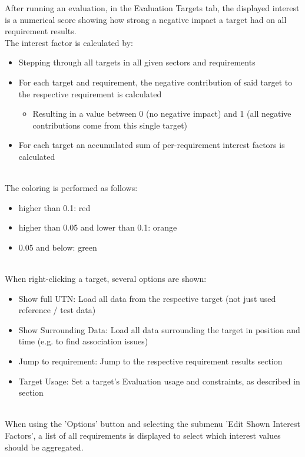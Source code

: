 After running an evaluation, in the Evaluation Targets tab, the displayed interest is a numerical score showing how strong a negative impact a target had on all requirement results. \\

The interest factor is calculated by:
\begin{itemize}  
\item Stepping through all targets in all given sectors and requirements
\item For each target and requirement, the negative contribution of said target to the respective requirement is calculated
\begin{itemize}  
\item Resulting in a value between 0 (no negative impact) and 1 (all negative contributions come from this single target)
\end{itemize}
\item For each target an accumulated sum of per-requirement interest factors is calculated
\end{itemize}
\ \\

The coloring is performed as follows:
\begin{itemize}  
\item higher than 0.1: red
\item higher than 0.05 and lower than 0.1: orange
\item 0.05 and below: green
\end{itemize}
\ \\

When right-clicking a target, several options are shown:

\begin{itemize}  
\item Show full UTN: Load all data from the respective target (not just used reference / test data)
\item Show Surrounding Data: Load all data surrounding the target in position and time (e.g. to find association issues)
\item Jump to requirement: Jump to the respective requirement results section
\item Target Usage: Set a target's Evaluation usage and constraints, as described in section 
\end{itemize}
\ \\

When using the 'Options' button and selecting the submenu 'Edit Shown Interest Factors', a list of all requirements is displayed to select which interest values should be aggregated.

